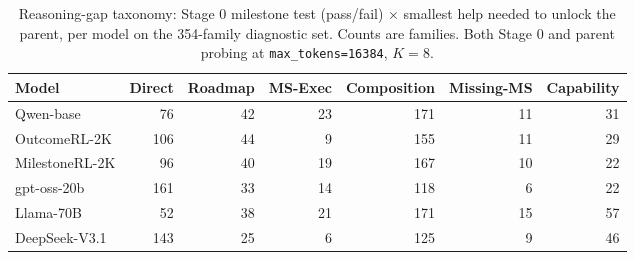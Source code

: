 \begin{table}[h]
\centering
\small
\caption{Reasoning-gap taxonomy: Stage 0 milestone test (pass/fail) $\times$ smallest help needed to unlock the parent, per model on the 354-family diagnostic set. Counts are families. Both Stage 0 and parent probing at \texttt{max\_tokens=16384}, $K{=}8$.}
\label{tab:bottleneck_lattice}
\vspace{4pt}
\setlength{\tabcolsep}{4pt}
\begin{tabular}{lrrrrrr}
\toprule
\textbf{Model} & \textbf{Direct} & \textbf{Roadmap} & \textbf{MS-Exec} & \textbf{Composition} & \textbf{Missing-MS} & \textbf{Capability} \\
\midrule
Qwen-base & 76 & 42 & 23 & 171 & 11 & 31 \\
OutcomeRL-2K & 106 & 44 & 9 & 155 & 11 & 29 \\
MilestoneRL-2K & 96 & 40 & 19 & 167 & 10 & 22 \\
gpt-oss-20b & 161 & 33 & 14 & 118 & 6 & 22 \\
Llama-70B & 52 & 38 & 21 & 171 & 15 & 57 \\
DeepSeek-V3.1 & 143 & 25 & 6 & 125 & 9 & 46 \\
\bottomrule
\end{tabular}
\end{table}
